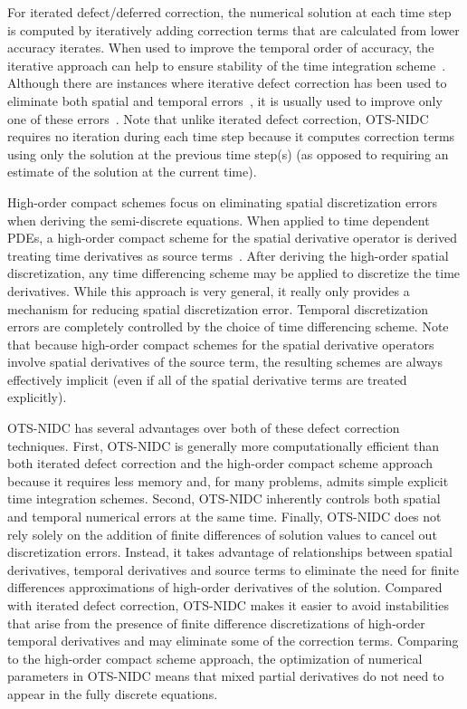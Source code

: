 \documentclass[fleqn,12pt,twoside]{article}
\begin{document}
For iterated defect/deferred correction, the numerical solution at each 
time step is computed by iteratively adding correction terms that are 
calculated from lower accuracy iterates.  When used to improve the 
temporal order of accuracy, the iterative approach can help to ensure 
stability of the time integration scheme~\cite{kress_2006}.  Although there 
are instances where iterative defect correction has been used to eliminate 
both spatial and temporal errors~\cite{gustafsson_2002}, it is usually used to 
improve only one of these errors~\cite{pereyra_1968,kress_2002,kress_2006}.
Note that unlike iterated defect correction, OTS-NIDC requires no iteration 
during each time step because it computes correction terms using only the 
solution at the previous time step(s) (as opposed to requiring an estimate 
of the solution at the current time).

High-order compact schemes focus on eliminating spatial discretization errors 
when deriving the semi-discrete equations.  When applied to time dependent 
PDEs, a high-order compact scheme for the spatial derivative operator is 
derived treating time derivatives as source 
terms~\cite{spotz_2001,ito_2005,heidenreich_2007}.  
After deriving the high-order spatial discretization, any time differencing 
scheme may be applied to discretize the time derivatives.  While this 
approach is very general, it really only provides a mechanism for reducing 
spatial discretization error.  Temporal discretization errors are completely 
controlled by the choice of time differencing scheme.  Note that because 
high-order compact schemes for the spatial derivative operators involve spatial 
derivatives of the source term, the resulting schemes are always effectively 
implicit (even if all of the spatial derivative terms are treated explicitly).  

OTS-NIDC has several advantages over both of these defect correction 
techniques.  First, OTS-NIDC is generally more computationally efficient than 
both iterated defect correction and the high-order compact scheme approach
because it requires less memory and, for many problems, admits simple 
explicit time integration schemes.  Second, OTS-NIDC inherently controls both 
spatial and temporal numerical errors at the same time.  Finally, OTS-NIDC 
does not rely solely on the addition of finite differences of solution values 
to cancel out discretization errors.  Instead, it takes advantage of 
relationships between spatial derivatives, temporal derivatives and source 
terms to eliminate the need for finite differences approximations of 
high-order derivatives of the solution.  Compared with iterated defect 
correction, OTS-NIDC makes it easier to avoid instabilities that arise from 
the presence of finite difference discretizations of high-order temporal 
derivatives and may eliminate some of the correction terms.  Comparing to the
high-order compact scheme approach, the optimization of numerical parameters 
in OTS-NIDC means that mixed partial derivatives do not need to appear in the 
fully discrete equations.
\end{document}
